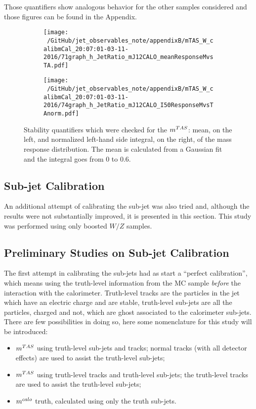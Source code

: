 Those quantifiers show analogous behavior for the other samples considered and those figures can be found in the Appendix.

\begin{figure}
    \centering
    \begin{subfigure}[b]{0.45\textwidth}
	\centering
        \texttt{[image: ~/GitHub/jet\_observables\_note/appendixB/mTAS\_W\_calibmCal\_20:07:01-03-11-2016/71graph\_h\_JetRatio\_mJ12CALO\_meanResponseMvsTA.pdf]}
    \end{subfigure}
    \begin{subfigure}[b]{0.45\textwidth}
	\centering
        \texttt{[image: ~/GitHub/jet\_observables\_note/appendixB/mTAS\_W\_calibmCal\_20:07:01-03-11-2016/74graph\_h\_JetRatio\_mJ12CALO\_I50ResponseMvsTAnorm.pdf]}
 
    \end{subfigure}
    \caption[Mean and left-hand side integral for boosted $W/Z$]{Stability quantifiers which were checked for the $m^{TAS}$: mean, on the left, and normalized left-hand side integral, on the right, of the mass response distribution. The mean is calculated from a Gaussian fit and the integral goes from 0 to 0.6.} 
    \label{fig:meanandtail}
\end{figure}

\subsection{Sub-jet Calibration}

An additional attempt of calibrating the sub-jet was also tried and, although the results were not substantially improved, it is presented in this section. This study was performed using only boosted $W/Z$ samples.

\subsection{Preliminary Studies on Sub-jet Calibration}
The first attempt in calibrating the sub-jets had as start a ``perfect calibration'', which means using the truth-level information from the MC sample \textit{before} the interaction with the calorimeter.
Truth-level tracks are the particles in the jet which have an electric charge and are stable, truth-level sub-jets are all the particles, charged and not, which are ghost associated to the calorimeter sub-jets.
There are few possibilities in doing so, here some nomenclature for this study will be introduced:
\begin{itemize}
 \item $m^{TAS}$ using truth-level sub-jets and tracks; normal tracks (with all detector effects) are used to assist the truth-level sub-jets;
 \item $m^{TAS}$ using truth-level tracks and truth-level sub-jets; the truth-level tracks are used to assist the truth-level sub-jets;
 \item $m^{calo}$ truth, calculated using only the truth sub-jets.
\end{itemize}


